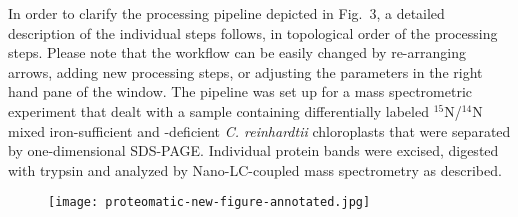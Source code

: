 \documentclass[11pt,letterpaper]{article}
\begin{document}
In order to clarify the processing pipeline depicted in Fig.~3, 
a detailed description of the individual steps follows, in topological order
of the processing steps.
Please note that the workflow can be easily changed by re-arranging arrows, 
adding new processing steps, or adjusting the parameters in the right hand pane
of the window.
The pipeline was set up for a mass spectrometric experiment that dealt with a
sample containing differentially labeled $^{15}$N/$^{14}$N mixed iron-sufficient
and -deficient {\em C. reinhardtii} chloroplasts that were separated by 
one-dimensional SDS-PAGE. Individual protein bands were excised, digested with 
trypsin and analyzed by Nano-LC-coupled mass spectrometry as 
described.

\begin{figure}[h]
\texttt{[image: proteomatic-new-figure-annotated.jpg]}
\end{figure}
\end{document}
